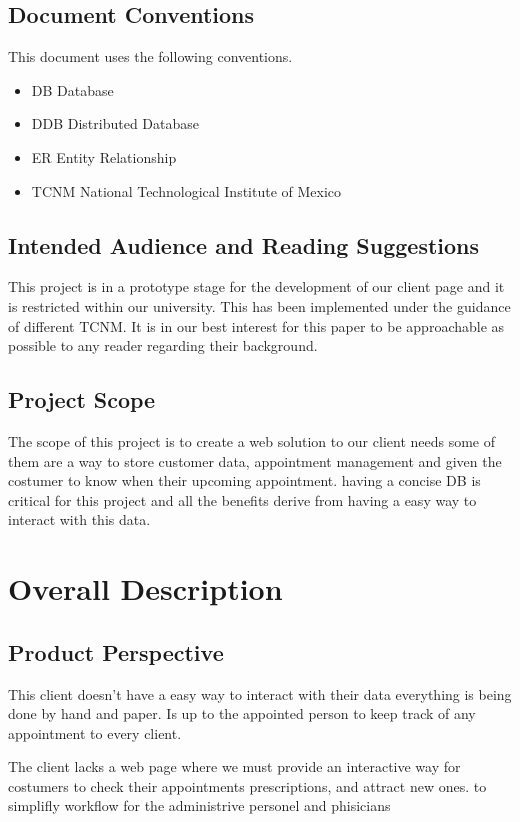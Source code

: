 \documentclass{scrreprt}
\begin{document}
	\section{Document Conventions}
	This document uses the following conventions.
	\begin{itemize}
\item		DB 		Database
\item		DDB		Distributed Database
\item		ER 		Entity Relationship
\item		TCNM	National Technological Institute of Mexico
	\end{itemize}
	\section{Intended Audience and Reading Suggestions}
	This project is in a prototype stage for the development of our client page and it is restricted within our university. This has been implemented under the guidance of different TCNM. It is in our best interest for this paper to be approachable as possible to any reader regarding their background.
	
	
	\section{Project Scope}
	The scope of this project is to create a web solution to our client needs some of them are a way to store customer data, appointment management and
	given the costumer to know when their upcoming appointment.
	having a concise DB is critical for this project and all the benefits derive from having a easy way to interact with this data.
	
	
	
	\chapter{Overall Description}
	
	\section{Product Perspective}
	This client doesn't have a easy way to interact with their data everything is being done by hand and paper. Is up to the appointed person to keep track of any appointment to every client.
	
	The client lacks a web page where we must provide an interactive  way for costumers to check their appointments prescriptions, and attract new ones. to simplifly workflow for the administrive personel and phisicians 
	
\end{document}
